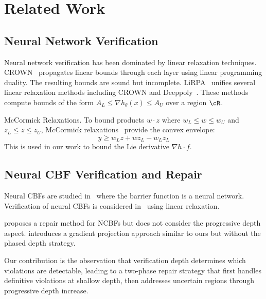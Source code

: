 \section{Related Work}

\subsection{Neural Network Verification}

Neural network verification has been dominated by linear relaxation techniques. CROWN~\citep{ruppert1998ball, hwang2020crown} propagates linear bounds through each layer using linear programming duality. The resulting bounds are sound but incomplete. LiRPA~\citep{shi2020efficient} unifies several linear relaxation methods including CROWN and Deeppoly~\citep{gehr2018ai2}. These methods compute bounds of the form $A_L \leq \nabla h_\theta(x) \leq A_U$ over a region $\cR$.

\begin{paragraph}{McCormick Relaxations.}
To bound products $w \cdot z$ where $w_L \leq w \leq w_U$ and $z_L \leq z \leq z_U$, McCormick relaxations~\citep{mccormick1976computability} provide the convex envelope:
\begin{equation}
    y \geq w_L z + w z_L - w_L z_L
\end{equation}
This is used in our work to bound the Lie derivative $\nabla h \cdot f$.
\end{paragraph}

\subsection{Neural CBF Verification and Repair}

Neural CBFs are studied in~\citep{cheng2019end, agarwal2019learning} where the barrier function is a neural network. Verification of neural CBFs is considered in~\citep{srinivasan2020verification, chang2019verified} using linear relaxation. 

\citep{zhao2020neural} proposes a repair method for NCBFs but does not consider the progressive depth aspect. \citep{islam2024repair} introduces a gradient projection approach similar to ours but without the phased depth strategy.

Our contribution is the observation that verification depth determines which violations are detectable, leading to a two-phase repair strategy that first handles definitive violations at shallow depth, then addresses uncertain regions through progressive depth increase.

